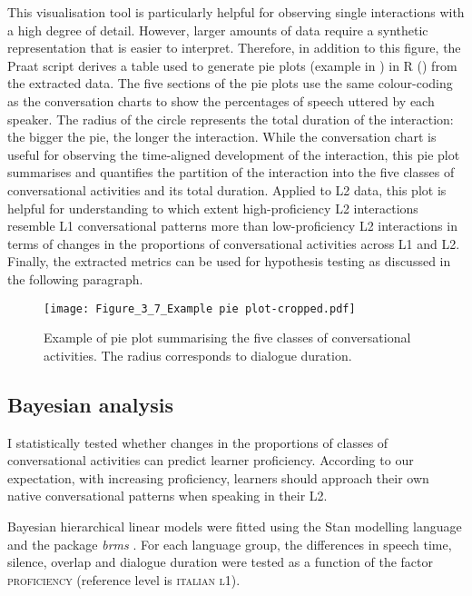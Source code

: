 This visualisation tool is particularly helpful for observing single interactions with a high degree of detail. However, larger amounts of data require a synthetic representation that is easier to interpret. Therefore, in addition to this figure, the Praat script derives a table used to generate pie plots (example in ) in R (\citealt{R_core_team2013}) from the extracted data. The five sections of the pie plots use the same colour-coding as the conversation charts to show the percentages of speech uttered by each speaker. The radius of the circle represents the total duration of the interaction: the bigger the pie, the longer the interaction. While the conversation chart is useful for observing the time-aligned development of the interaction, this pie plot summarises and quantifies the partition of the interaction into the five classes of conversational activities and its total duration. Applied to L2 data, this plot is helpful for understanding to which extent high-proficiency L2 interactions resemble L1 conversational patterns more than low-proficiency L2 interactions in terms of changes in the proportions of conversational activities across L1 and L2. Finally, the extracted metrics can be used for hypothesis testing as discussed in the following paragraph.
 

\begin{figure}
\texttt{[image: Figure\_3\_7\_Example pie plot-cropped.pdf]}
\caption{Example of pie plot summarising the five classes of conversational activities. The radius corresponds to dialogue duration.}
\label{fig:3.7}
\end{figure}

\subsection{Bayesian analysis}
\label{sec:3.2.5}
I statistically tested whether changes in the proportions of classes of conversational activities can predict learner proficiency. According to our expectation, with increasing proficiency, learners should approach their own native conversational patterns when speaking in their L2.

Bayesian hierarchical linear models were fitted using the Stan modelling language \citep{CarpenterEtAl2017} and the package \textit{brms} \citep{Bürkner2016}. For each language group, the differences in speech time, silence, overlap and dialogue duration were tested as a function of the factor \textsc{proficiency} (reference level is \textsc{italian l1}).

